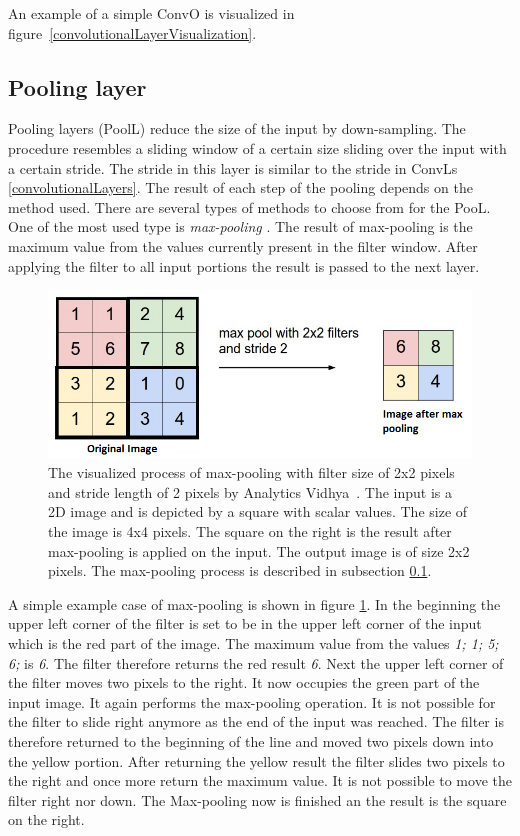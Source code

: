 An example of a simple ConvO is visualized in figure~\ref{convolutionalLayerVisualization}. 


\subsection{Pooling layer}\label{poolingLayers}
Pooling layers (PoolL) reduce the size of the input by down-sampling. The procedure resembles a sliding window of a certain size sliding over the input with a certain stride. The stride in this layer is similar to the stride in ConvLs \ref{convolutionalLayers}. The result of each step of the pooling depends on the method used. There are several types of methods to choose from for the PooL. One of the most used type is \textit{max-pooling} \cite{CNN}. The result of max-pooling is the maximum value from the values currently present in the filter window. After applying the filter to all input portions the result is passed to the next layer.
\begin{figure}[ht!]
  \centering
  \includegraphics[width=\textwidth]{Images/maxPooling.png}
  \caption{The visualized process of max-pooling with filter size of 2x2 pixels and stride length of 2 pixels by Analytics Vidhya~\cite{maxPoolingVisualization}. The input is a 2D image and is depicted by a square with scalar values. The size of the image is 4x4 pixels. The square on the right is the result after max-pooling is applied on the input. The output image is of size 2x2 pixels. The max-pooling process is described in subsection \ref{poolingLayers}.} 
  \label{maxPoolingVisualization}
\end{figure} 

A simple example case of max-pooling is shown in figure \ref{maxPoolingVisualization}. In the beginning the upper left corner of the filter is set to be in the upper left corner of the input which is the red part of the image. The maximum value from the values \textit{1; 1; 5; 6;} is \textit{6}. The filter therefore returns the red result \textit{6}. Next the upper left corner of the filter moves two pixels to the right. It now occupies the green part of the input image. It again performs the max-pooling operation. It is not possible for the filter to slide right anymore as the end of the input was reached. The filter is therefore returned to the beginning of the line and moved two pixels down into the yellow portion. After returning the yellow result the filter slides two pixels to the right and once more return the maximum value. It is not possible to move the filter right nor down. The Max-pooling now is finished an the result is the square on the right.
